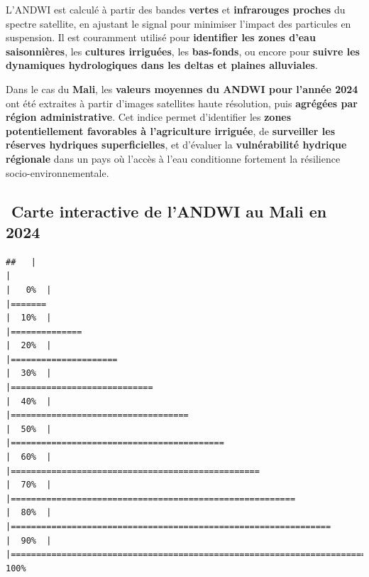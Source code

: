 \documentclass[
]{book}
\begin{document}
L'ANDWI est calculé à partir des bandes \textbf{vertes} et \textbf{infrarouges proches} du spectre satellite, en ajustant le signal pour minimiser l'impact des particules en suspension. Il est couramment utilisé pour \textbf{identifier les zones d'eau saisonnières}, les \textbf{cultures irriguées}, les \textbf{bas-fonds}, ou encore pour \textbf{suivre les dynamiques hydrologiques dans les deltas et plaines alluviales}.

Dans le cas du \textbf{Mali}, les \textbf{valeurs moyennes du ANDWI pour l'année 2024} ont été extraites à partir d'images satellites haute résolution, puis \textbf{agrégées par région administrative}. Cet indice permet d'identifier les \textbf{zones potentiellement favorables à l'agriculture irriguée}, de \textbf{surveiller les réserves hydriques superficielles}, et d'évaluer la \textbf{vulnérabilité hydrique régionale} dans un pays où l'accès à l'eau conditionne fortement la résilience socio-environnementale.

\subsection{\texorpdfstring{️ Carte interactive de l'ANDWI au Mali en 2024}{️ Carte interactive de l'ANDWI au Mali en 2024}}\label{carte-interactive-de-landwi-au-mali-en-2024}

\begin{verbatim}
##   |                                                                              |                                                                      |   0%  |                                                                              |=======                                                               |  10%  |                                                                              |==============                                                        |  20%  |                                                                              |=====================                                                 |  30%  |                                                                              |============================                                          |  40%  |                                                                              |===================================                                   |  50%  |                                                                              |==========================================                            |  60%  |                                                                              |=================================================                     |  70%  |                                                                              |========================================================              |  80%  |                                                                              |===============================================================       |  90%  |                                                                              |======================================================================| 100%
\end{verbatim}
\end{document}
